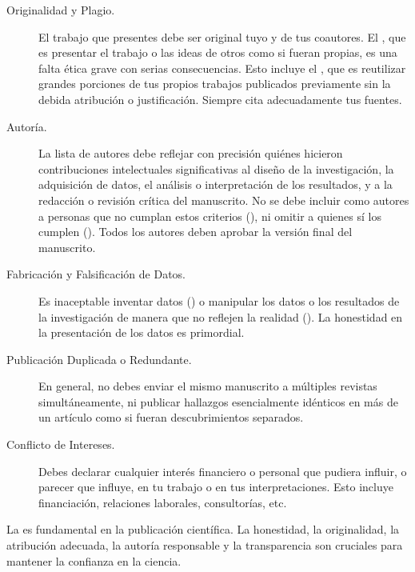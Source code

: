 \begin{description}
  \item[Originalidad y Plagio.] El trabajo que presentes debe ser original
        tuyo y de tus coautores.
        El , que es presentar el trabajo o las ideas de
        otros como si fueran propias, es una falta ética grave con serias
        consecuencias.
        Esto incluye el , que es reutilizar grandes
        porciones de tus propios trabajos publicados previamente sin la debida
        atribución o justificación.
        Siempre cita adecuadamente tus fuentes.

  \item[Autoría.] La lista de autores debe reflejar con precisión quiénes
        hicieron contribuciones intelectuales significativas al diseño de la
        investigación, la adquisición de datos, el análisis o interpretación de
        los resultados, y a la redacción o revisión crítica del manuscrito.
        No se debe incluir como autores a personas que no cumplan estos
        criterios (),
        ni omitir a quienes sí los cumplen ().
        Todos los autores deben aprobar la versión final del manuscrito.

  \item[Fabricación y Falsificación de Datos.] Es inaceptable inventar datos
        () o manipular los datos o los resultados de
        la investigación de manera que no reflejen la realidad
        ().
        La honestidad en la presentación de los datos es primordial.

  \item[Publicación Duplicada o Redundante.] En general, no debes enviar el
        mismo manuscrito a múltiples revistas simultáneamente, ni publicar
        hallazgos esencialmente idénticos en más de un artículo como si fueran
        descubrimientos separados.

  \item[Conflicto de Intereses.] Debes declarar cualquier interés financiero o
        personal que pudiera influir, o parecer que influye, en tu trabajo o en
        tus interpretaciones.
        Esto incluye financiación, relaciones laborales, consultorías, etc.
\end{description}

\begin{remember}
  \label{rem:eticaarticulo}
  La  es fundamental en la
  publicación científica.
  La honestidad, la originalidad, la atribución adecuada, la autoría
  responsable y la transparencia son cruciales para mantener la confianza en
  la ciencia.
\end{remember}

